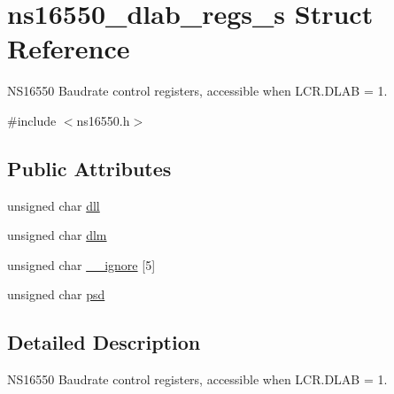 \hypertarget{structns16550__dlab__regs__s}{\section{ns16550\-\_\-dlab\-\_\-regs\-\_\-s Struct Reference}
\label{structns16550__dlab__regs__s}
}


N\-S16550 Baudrate control registers, accessible when L\-C\-R.\-D\-L\-A\-B = 1.  




{\ttfamily \#include $<$ns16550.\-h$>$}

\subsection*{Public Attributes}
\begin{DoxyCompactItemize}
\item 
unsigned char \hyperlink{structns16550__dlab__regs__s_a643629364b1584ebfb558b01974ac799}{dll}
\item 
unsigned char \hyperlink{structns16550__dlab__regs__s_a5fdab6bd62f37d5bf79cc816acd32690}{dlm}
\item 
unsigned char \hyperlink{structns16550__dlab__regs__s_a837b0aae8d55aa608895b0b173b162f1}{\-\_\-\-\_\-ignore} \mbox{[}5\mbox{]}
\item 
unsigned char \hyperlink{structns16550__dlab__regs__s_a6555166a4c6457022dd66d1b63d4e164}{psd}
\end{DoxyCompactItemize}


\subsection{Detailed Description}
N\-S16550 Baudrate control registers, accessible when L\-C\-R.\-D\-L\-A\-B = 1. 

